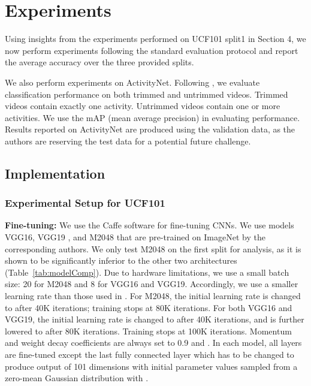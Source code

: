 \documentclass[10pt,twocolumn,letterpaper]{article}
\begin{document}
\section{Experiments} 
\label{sec:experiment}

\noindent Using insights from the experiments performed on UCF101 split1 in Section 4, we now perform experiments following the standard evaluation protocol \cite{THUMOS13} and report the average accuracy over the three provided splits. 

We also perform experiments on ActivityNet. Following \cite{caba2015activitynet}, we evaluate classification performance on both trimmed and untrimmed videos. Trimmed videos contain exactly one activity. Untrimmed videos contain one or more activities. We use the mAP (mean average precision) in evaluating performance. Results reported on ActivityNet are produced using the validation data, as the authors are reserving the test data for a potential future challenge.

\subsection{Implementation}
\subsubsection{Experimental Setup for UCF101}
\noindent \textbf{Fine-tuning:} We use the Caffe \cite{jia2014caffe} software for fine-tuning CNNs. We use models VGG16, VGG19 \cite{simonyan2014very}, and M2048 \cite{chatfield2014return} that are pre-trained on ImageNet by the corresponding authors.
We only test M2048 on the first split for analysis, as it is shown to be significantly inferior to the other two architectures (Table~\ref{tab:modelComp}). Due to hardware limitations, we use a small batch size: 20 for M2048 and 8 for VGG16 and VGG19.
Accordingly, we use a smaller learning rate than those used in  \cite{chatfield2014return, simonyan2014very}. For M2048, the initial learning rate  is changed to  after 40K iterations; training stops at 80K iterations. For both VGG16 and VGG19, the initial learning rate  is changed to  after 40K iterations, and is further lowered to  after 80K iterations. Training stops at 100K iterations. 
Momentum and weight decay coefficients are always set to 0.9 and . In each model, all layers are fine-tuned except the last fully connected layer which has to be changed to produce output of 101 dimensions with initial parameter values sampled from a zero-mean Gaussian distribution with .
\end{document}
